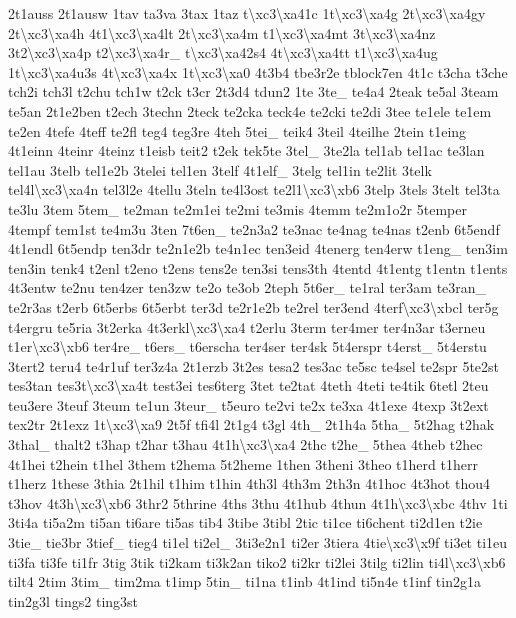 \begin{DoxyCompactItemize}
2t1auss 2t1ausw 1tav ta3va 3tax 1taz t\textbackslash{}xc3\textbackslash{}xa41c 1t\textbackslash{}xc3\textbackslash{}xa4g 2t\textbackslash{}xc3\textbackslash{}xa4gy 2t\textbackslash{}xc3\textbackslash{}xa4h 4t1\textbackslash{}xc3\textbackslash{}xa4lt 2t\textbackslash{}xc3\textbackslash{}xa4m t1\textbackslash{}xc3\textbackslash{}xa4mt 3t\textbackslash{}xc3\textbackslash{}xa4nz 3t2\textbackslash{}xc3\textbackslash{}xa4p t2\textbackslash{}xc3\textbackslash{}xa4r\-\_\- t\textbackslash{}xc3\textbackslash{}xa42s4 4t\textbackslash{}xc3\textbackslash{}xa4tt t1\textbackslash{}xc3\textbackslash{}xa4ug 1t\textbackslash{}xc3\textbackslash{}xa4u3s 4t\textbackslash{}xc3\textbackslash{}xa4x 1t\textbackslash{}xc3\textbackslash{}xa0 4t3b4 tbe3r2e tblock7en 4t1c t3cha t3che tch2i tch3l t2chu tch1w t2ck t3cr 2t3d4 tdun2 1te 3te\-\_\- te4a4 2teak te5al 3team te5an 2t1e2ben t2ech 3techn 2teck te2cka teck4e te2cki te2di 3tee te1ele te1em te2en 4tefe 4teff te2fl teg4 teg3re 4teh 5tei\-\_\- teik4 3teil 4teilhe 2tein t1eing 4t1einn 4teinr 4teinz t1eisb teit2 t2ek tek5te 3tel\-\_\- 3te2la tel1ab tel1ac te3lan tel1au 3telb tel1e2b 3telei tel1en 3telf 4t1elf\-\_\- 3telg tel1in te2lit 3telk tel4l\textbackslash{}xc3\textbackslash{}xa4n tel3l2e 4tellu 3teln te4l3ost te2l1\textbackslash{}xc3\textbackslash{}xb6 3telp 3tels 3telt tel3ta te3lu 3tem 5tem\-\_\- te2man te2m1ei te2mi te3mis 4temm te2m1o2r 5temper 4tempf tem1st te4m3u 3ten 7t6en\-\_\- te2n3a2 te3nac te4nag te4nas t2enb 6t5endf 4t1endl 6t5endp ten3dr te2n1e2b te4n1ec ten3eid 4tenerg ten4erw t1eng\-\_\- ten3im ten3in tenk4 t2enl t2eno t2ens tens2e ten3si tens3th 4tentd 4t1entg t1entn t1ents 4t3entw te2nu ten4zer ten3zw te2o te3ob 2teph 5t6er\-\_\- te1ral ter3am te3ran\-\_\- te2r3as t2erb 6t5erbs 6t5erbt ter3d te2r1e2b te2rel ter3end 4terf\textbackslash{}xc3\textbackslash{}xbcl ter5g t4ergru te5ria 3t2erka 4t3erkl\textbackslash{}xc3\textbackslash{}xa4 t2erlu 3term ter4mer ter4n3ar t3erneu t1er\textbackslash{}xc3\textbackslash{}xb6 ter4re\-\_\- t6ers\-\_\- t6erscha ter4ser ter4sk 5t4erspr t4erst\-\_\- 5t4erstu 3tert2 teru4 te4r1uf ter3z4a 2t1erzb 3t2es tesa2 tes3ac te5sc te4sel te2spr 5te2st tes3tan tes3t\textbackslash{}xc3\textbackslash{}xa4t test3ei tes6terg 3tet te2tat 4teth 4teti te4tik 6tetl 2teu teu3ere 3teuf 3teum te1un 3teur\-\_\- t5euro te2vi te2x te3xa 4t1exe 4texp 3t2ext tex2tr 2t1exz 1t\textbackslash{}xc3\textbackslash{}xa9 2t5f tfi4l 2t1g4 t3gl 4th\-\_\- 2t1h4a 5tha\-\_\- 5t2hag t2hak 3thal\-\_\- thalt2 t3hap t2har t3hau 4t1h\textbackslash{}xc3\textbackslash{}xa4 2thc t2he\-\_\- 5thea 4theb t2hec 4t1hei t2hein t1hel 3them t2hema 5t2heme 1then 3theni 3theo t1herd t1herr t1herz 1these 3thia 2t1hil t1him t1hin 4th3l 4th3m 2th3n 4t1hoc 4t3hot thou4 t3hov 4t3h\textbackslash{}xc3\textbackslash{}xb6 3thr2 5thrine 4ths 3thu 4t1hub 4thun 4t1h\textbackslash{}xc3\textbackslash{}xbc 4thv 1ti 3ti4a ti5a2m ti5an ti6are ti5as tib4 3tibe 3tibl 2tic ti1ce ti6chent ti2d1en t2ie 3tie\-\_\- tie3br 3tief\-\_\- tieg4 ti1el ti2el\-\_\- 3ti3e2n1 ti2er 3tiera 4tie\textbackslash{}xc3\textbackslash{}x9f ti3et ti1eu ti3fa ti3fe ti1fr 3tig 3tik ti2kam ti3k2an tiko2 ti2kr ti2lei 3tilg ti2lin ti4l\textbackslash{}xc3\textbackslash{}xb6 tilt4 2tim 3tim\-\_\- tim2ma t1imp 5tin\-\_\- ti1na t1inb 4t1ind ti5n4e t1inf tin2g1a tin2g3l tings2 ting3st 
\end{DoxyCompactItemize}
